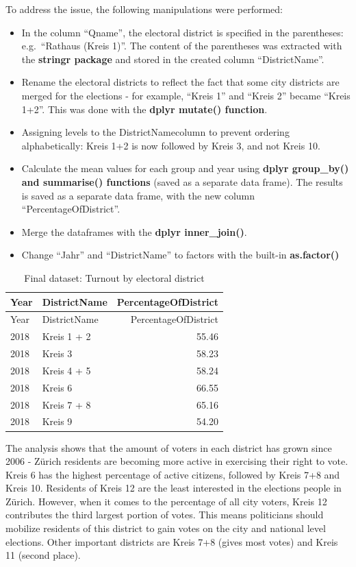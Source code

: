 \documentclass[
]{article}
\providecommand{\tightlist}{%
  \setlength{\itemsep}{0pt}\setlength{\parskip}{0pt}}
\begin{document}
To address the issue, the following manipulations were performed:

\begin{itemize}
\tightlist
\item
  In the column ``Qname'', the electoral district is specified in the
  parentheses: e.g.~``Rathaus (Kreis 1)''. The content of the
  parentheses was extracted with the \textbf{stringr package} and stored
  in the created column ``DistrictName''.
\item
  Rename the electoral districts to reflect the fact that some city
  districts are merged for the elections - for example, ``Kreis 1'' and
  ``Kreis 2'' became ``Kreis 1+2''. This was done with the \textbf{dplyr
  mutate() function}.
\item
  Assigning levels to the DistrictNamecolumn to prevent ordering
  alphabetically: Kreis 1+2 is now followed by Kreis 3, and not Kreis
  10.
\item
  Calculate the mean values for each group and year using \textbf{dplyr
  group\_by() and summarise() functions} (saved as a separate data
  frame). The results is saved as a separate data frame, with the new
  column ``PercentageOfDistrict''.
\item
  Merge the dataframes with the \textbf{dplyr inner\_join()}.
\item
  Change ``Jahr'' and ``DistrictName'' to factors with the built-in
  \textbf{as.factor()}
\end{itemize}

\begin{longtable}[]{@{}llr@{}}
\caption{Final dataset: Turnout by electoral district}\tabularnewline
\toprule
Year & DistrictName & PercentageOfDistrict \\
\midrule
\endfirsthead
\toprule
Year & DistrictName & PercentageOfDistrict \\
\midrule
\endhead
2018 & Kreis 1 + 2 & 55.46 \\
2018 & Kreis 3 & 58.23 \\
2018 & Kreis 4 + 5 & 58.24 \\
2018 & Kreis 6 & 66.55 \\
2018 & Kreis 7 + 8 & 65.16 \\
2018 & Kreis 9 & 54.20 \\
\bottomrule
\end{longtable}

The analysis shows that the amount of voters in each district has grown
since 2006 - Zürich residents are becoming more active in exercising
their right to vote. Kreis 6 has the highest percentage of active
citizens, followed by Kreis 7+8 and Kreis 10. Residents of Kreis 12 are
the least interested in the elections people in Zürich. However, when it
comes to the percentage of all city voters, Kreis 12 contributes the
third largest portion of votes. This means politicians should mobilize
residents of this district to gain votes on the city and national level
elections. Other important districts are Kreis 7+8 (gives most votes)
and Kreis 11 (second place).
\end{document}
